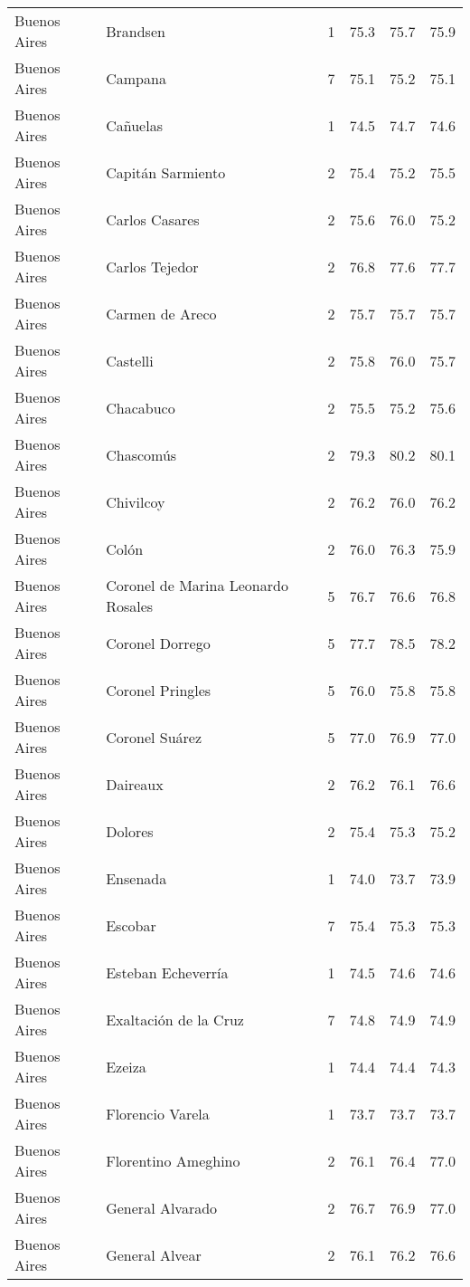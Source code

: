 \documentclass[12pt,spanish,]{article}
\begin{document}
\begin{landscape}
\begin{longtable}[t]{llrrrr}
Buenos Aires & Brandsen & 1 & 75.3 & 75.7 & 75.9\\
Buenos Aires & Campana & 7 & 75.1 & 75.2 & 75.1\\
\addlinespace
Buenos Aires & Cañuelas & 1 & 74.5 & 74.7 & 74.6\\
Buenos Aires & Capitán Sarmiento & 2 & 75.4 & 75.2 & 75.5\\
Buenos Aires & Carlos Casares & 2 & 75.6 & 76.0 & 75.2\\
Buenos Aires & Carlos Tejedor & 2 & 76.8 & 77.6 & 77.7\\
Buenos Aires & Carmen de Areco & 2 & 75.7 & 75.7 & 75.7\\
\addlinespace
Buenos Aires & Castelli & 2 & 75.8 & 76.0 & 75.7\\
Buenos Aires & Chacabuco & 2 & 75.5 & 75.2 & 75.6\\
Buenos Aires & Chascomús & 2 & 79.3 & 80.2 & 80.1\\
Buenos Aires & Chivilcoy & 2 & 76.2 & 76.0 & 76.2\\
Buenos Aires & Colón & 2 & 76.0 & 76.3 & 75.9\\
\addlinespace
Buenos Aires & Coronel de Marina Leonardo Rosales & 5 & 76.7 & 76.6 & 76.8\\
Buenos Aires & Coronel Dorrego & 5 & 77.7 & 78.5 & 78.2\\
Buenos Aires & Coronel Pringles & 5 & 76.0 & 75.8 & 75.8\\
Buenos Aires & Coronel Suárez & 5 & 77.0 & 76.9 & 77.0\\
Buenos Aires & Daireaux & 2 & 76.2 & 76.1 & 76.6\\
\addlinespace
Buenos Aires & Dolores & 2 & 75.4 & 75.3 & 75.2\\
Buenos Aires & Ensenada & 1 & 74.0 & 73.7 & 73.9\\
Buenos Aires & Escobar & 7 & 75.4 & 75.3 & 75.3\\
Buenos Aires & Esteban Echeverría & 1 & 74.5 & 74.6 & 74.6\\
Buenos Aires & Exaltación de la Cruz & 7 & 74.8 & 74.9 & 74.9\\
\addlinespace
Buenos Aires & Ezeiza & 1 & 74.4 & 74.4 & 74.3\\
Buenos Aires & Florencio Varela & 1 & 73.7 & 73.7 & 73.7\\
Buenos Aires & Florentino Ameghino & 2 & 76.1 & 76.4 & 77.0\\
Buenos Aires & General Alvarado & 2 & 76.7 & 76.9 & 77.0\\
Buenos Aires & General Alvear & 2 & 76.1 & 76.2 & 76.6\\

\end{longtable}
\end{landscape}
\end{document}
